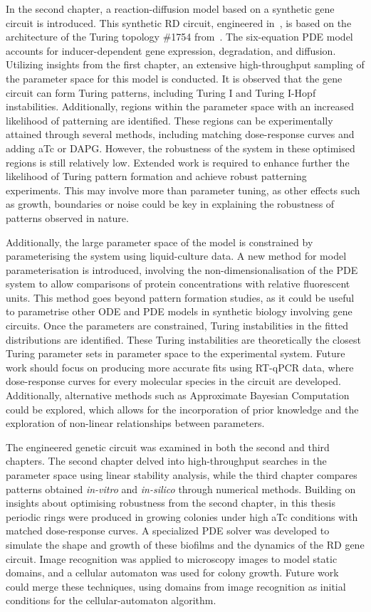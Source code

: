 In the second chapter, a reaction-diffusion model based on a synthetic gene circuit is introduced.
This synthetic RD circuit, engineered in~\cite{Tica2020}, is based on the architecture of the Turing topology \#1754 from~\cite{Scholes2019}.
The six-equation PDE model accounts for inducer-dependent gene expression, degradation, and diffusion.
Utilizing insights from the first chapter, an extensive high-throughput sampling of the parameter space for this model is conducted.
It is observed that the gene circuit can form Turing patterns, including Turing I and Turing I-Hopf instabilities.
Additionally, regions within the parameter space with an increased likelihood of patterning are identified.
These regions can be experimentally attained through several methods, including matching dose-response curves and adding aTc or DAPG.
However, the robustness of the system in these optimised regions is still relatively low.
Extended work is required to enhance further the likelihood of Turing pattern formation and achieve robust patterning experiments.
This may involve more than parameter tuning, as other effects such as growth, boundaries or noise could be key in explaining the robustness of patterns observed in nature.

Additionally, the large parameter space of the model is constrained by parameterising the system using liquid-culture data.
A new method for model parameterisation is introduced, involving the non-dimensionalisation of the PDE system to allow comparisons of protein concentrations with relative fluorescent units.
This method goes beyond pattern formation studies, as it could be useful to parametrise other ODE and PDE models in synthetic biology involving gene circuits.
Once the parameters are constrained, Turing instabilities in the fitted distributions are identified.
These Turing instabilities are theoretically the closest Turing parameter sets in parameter space to the experimental system.
Future work should focus on producing more accurate fits using RT-qPCR data, where dose-response curves for every molecular species in the circuit are developed.
Additionally, alternative methods such as Approximate Bayesian Computation could be explored, which allows for the incorporation of prior knowledge and the exploration of non-linear relationships between parameters.

The engineered genetic circuit was examined in both the second and third chapters.
The second chapter delved into high-throughput searches in the parameter space using linear stability analysis, while the third chapter compares patterns obtained \textit{in-vitro} and \textit{in-silico} through numerical methods.
Building on insights about optimising robustness from the second chapter, in this thesis periodic rings were produced in growing colonies under high aTc conditions with matched dose-response curves.
A specialized PDE solver was developed to simulate the shape and growth of these biofilms and the dynamics of the RD gene circuit.
Image recognition was applied to microscopy images to model static domains, and a cellular automaton was used for colony growth.
Future work could merge these techniques, using domains from image recognition as initial conditions for the cellular-automaton algorithm.

